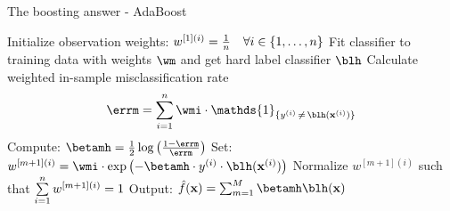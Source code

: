 \documentclass[11pt,compress,t,notes=noshow, xcolor=table]{beamer}
\begin{document}
\begin{vbframe}{The boosting answer - AdaBoost}
% 


\framebreak

\begin{algorithm}[H]
  \begin{algorithmic}[1]
    \State Initialize observation weights: $w^{[1](i)} = \frac{1}{n} \quad \forall i \in \{1, \ldots, n\}$
      \State Fit classifier to training data with weights $\wm$ and get hard label classifier $\blh$
      \State Calculate weighted in-sample misclassification rate \vspace*{-1ex}
      $$\errm = \sumin \wmi \cdot \mathds{1}_{\{\yi \,\neq\, \blh(\xi)\}}$$\vspace*{-1ex}
      \State Compute: $ \betamh = \frac{1}{2} \log \left( \frac{1 - \errm}{\errm}\right)$
      \State Set: $w^{[m+1](i)} = \wmi \cdot \exp\left(- \betamh \cdot
        \yi \cdot \blh(\xi)\right) $
      \State Normalize $w^{[m+1](i)}$ such that $\sum\limits_{i=1}^n w^{[m+1](i)} = 1$
    \EndFor
    \State Output: $\fxh = \sum_{m=1}^{M} \betamh \blh(\xv)$
  \end{algorithmic}
  \caption{AdaBoost}
\end{algorithm}

\end{vbframe}

\end{document}
